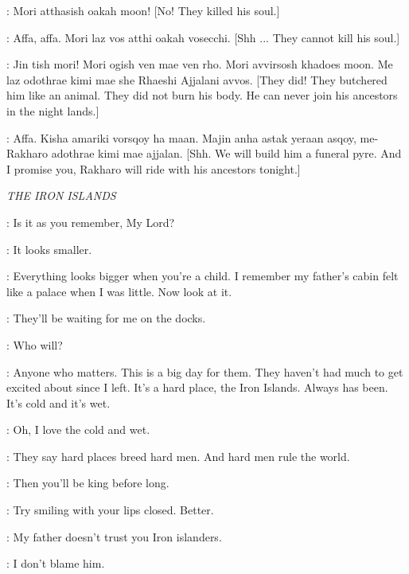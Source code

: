 \IRRI: Mori atthasish oakah moon! [No! They killed his soul.]

\DAENERYS: Affa, affa. Mori laz vos atthi oakah vosecchi. [Shh ... They cannot kill his soul.]

\IRRI: Jin tish mori! Mori ogish ven mae ven rho. Mori avvirsosh khadoes moon. Me laz odothrae kimi mae she Rhaeshi Ajjalani avvos. [They did! They butchered him like an animal. They did not burn his body. He can never join his ancestors in the night lands.]

\DAENERYS: Affa. Kisha amariki vorsqoy ha maan. Majin anha astak yeraan asqoy, me-Rakharo adothrae kimi mae ajjalan. [Shh. We will build him a funeral pyre. And I promise you, Rakharo will ride with his ancestors tonight.]


\scene

\newpage

\textit{THE IRON ISLANDS}


\WOMAN: Is it as you remember, My Lord?

\THEON: It looks smaller.

\WOMAN: Everything looks bigger when you're a child. I remember my father's cabin felt like a palace when I was little. Now look at it.

\THEON: They'll be waiting for me on the docks.

\WOMAN: Who will?

\THEON: Anyone who matters. This is a big day for them. They haven't had much to get excited about since I left. It's a hard place, the Iron Islands. Always has been. It's cold and it's wet.

\WOMAN: Oh, I love the cold and wet.

\THEON: They say hard places breed hard men. And hard men rule the world.

\WOMAN:  Then you'll be king before long.

\THEON: Try smiling with your lips closed. Better.


\WOMAN: My father doesn't trust you Iron islanders.

\THEON: I don't blame him.

